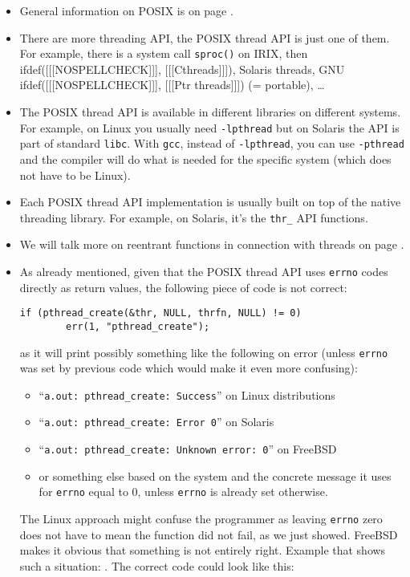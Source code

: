 \begin{itemize}
\item General information on POSIX is on page \pageref{POSIX}.
\item There are more threading API, the POSIX thread API is just one of them.
For example, there is a system call \texttt{sproc()} on IRIX, then
ifdef([[[NOSPELLCHECK]]], [[[Cthreads]]]),
Solaris threads, GNU ifdef([[[NOSPELLCHECK]]], [[[Ptr threads]]]) (= portable),
\dots
\item The POSIX thread API is available in different libraries on different
systems.  For example, on Linux you usually need \texttt{-lpthread} but on
Solaris the API is part of standard \texttt{libc}.  With \texttt{gcc}, instead
of \texttt{-lpthread}, you can use \texttt{-pthread} and the compiler will do
what is needed for the specific system (which does not have to be Linux).
\item Each POSIX thread API implementation is usually built on top of the native
threading library.  For example, on Solaris, it's the \texttt{thr\_} API
functions.
\item We will talk more on reentrant functions in connection with threads on
page \pageref{THREADSAFE}.
\item As already mentioned, given that the POSIX thread API uses \texttt{errno}
codes directly as return values, the following piece of code is not correct:

\begin{verbatim}
if (pthread_create(&thr, NULL, thrfn, NULL) != 0)
        err(1, "pthread_create");
\end{verbatim}

as it will print possibly something like the following on error (unless
\texttt{errno} was set by previous code which would make it even more
confusing):

\begin{itemize}
\item ``\texttt{a.out: pthread\_create: Success}'' on Linux distributions
\item ``\texttt{a.out: pthread\_create: Error 0}'' on Solaris
\item ``\texttt{a.out: pthread\_create: Unknown error: 0}'' on FreeBSD
\item or something else based on the system and the concrete message it uses for
\texttt{errno} equal to 0, unless \texttt{errno} is already set otherwise.
\end{itemize}

The Linux approach might confuse the programmer as leaving \texttt{errno} zero
does not have to mean the function did not fail, as we just showed.  FreeBSD
makes it obvious that something is not entirely right.  Example that shows such
a situation: . The correct code could look
like this:


\end{itemize}
